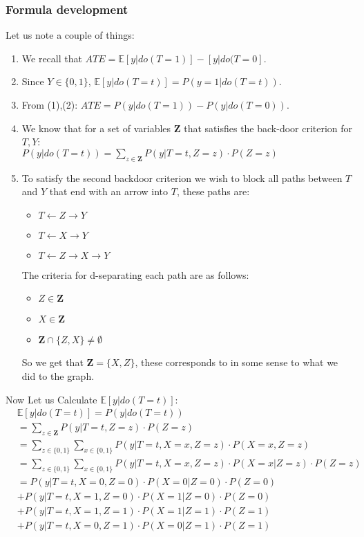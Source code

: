 \documentclass{article}
\begin{document}
\subsubsection*{Formula development}
Let us note a couple of things:
\begin{enumerate}
	\item We recall that $ATE=\mathds{E}[y|do(T=1)]-\mathds{}[y|do(T=0]$.
	\item Since $Y\in\{0,1\}$, $\mathds{E}[y|do(T=t)]=P(y=1|do(T=t))$.
	\item From (1),(2): $ATE=P(y|do(T=1))-P(y|do(T=0))$.
	\item We know that for a set of variables $\mathbf{Z}$ that satisfies the back-door criterion for $T,Y$: \\ $P(y|do(T=t))=\sum_{z \in{} \mathbf{Z}}P(y|T=t,Z=z) \cdot{} P(Z=z)$
	\item To satisfy the second backdoor criterion we wish to block all paths between $T$ and $Y$ that end with an arrow into $T$, these paths are:
	\begin{itemize}
    		\item $T\leftarrow{}Z\rightarrow{}Y$
		\item $T\leftarrow{}X\rightarrow{}Y$
   		\item $T\leftarrow{}Z\rightarrow{}X\rightarrow{}Y$
	\end{itemize}
The criteria for d-separating each path are as follows:
\begin{itemize}
    \item $Z\in{}\mathbf{Z}$
    \item $X\in{}\mathbf{Z}$
    \item $\mathbf{Z}\cap{}\{Z,X\}\neq{}\emptyset{}$
\end{itemize}
So we get that $\mathbf{Z}=\{X,Z\}$, these corresponds to in some sense to what we did to the graph.
\end{enumerate}

Now Let us Calculate $\mathds{E}[y|do(T=t)]$:
\begin{equation*}
    \begin{split}
	& \mathds{E}[y|do(T=t)] = P(y|do(T=t)) \\
        & =\sum_{z \in{} \mathbf{Z}}P(y|T=t,Z=z) \cdot{} P(Z=z) \\
        & =\sum_{z\in{}\{0,1\}}\sum_{x\in{}\{0,1\}}P(y|T=t, X=x, Z=z)\cdot{}P(X=x,Z=z)\\
        & =\sum_{z\in{}\{0,1\}}\sum_{x\in{}\{0,1\}}P(y|T=t, X=x, Z=z)\cdot{}P(X=x|Z=z)\cdot{}P(Z=z) \\
        & = P(y|T=t, X=0, Z=0)\cdot{}P(X=0|Z=0)\cdot{}P(Z=0) \\
        & +P(y|T=t, X=1, Z=0)\cdot{}P(X=1|Z=0)\cdot{}P(Z=0) \\
        & +P(y|T=t, X=1, Z=1)\cdot{}P(X=1|Z=1)\cdot{}P(Z=1) \\
        & +P(y|T=t, X=0, Z=1)\cdot{}P(X=0|Z=1)\cdot{}P(Z=1) \\
    \end{split}
\end{equation*}
\end{document}
